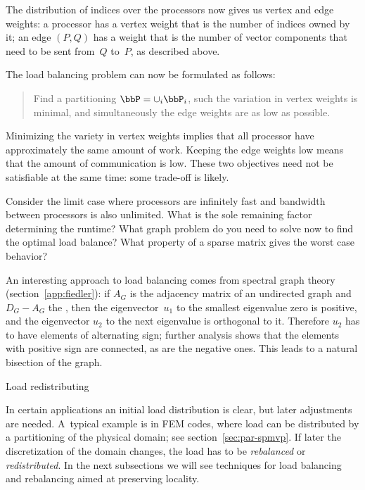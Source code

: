 The distribution of indices over the processors now gives us vertex
and edge weights: a processor has a vertex weight that is the number
of indices owned by it; an edge $(P,Q)$ has a weight that is the number of
vector components that need to be sent from~$Q$ to~$P$, as described above.

The load balancing problem can now be formulated as
follows:
\begin{quote}
  Find a partitioning $\bbP=\cup_i \bbP_i$, such the variation in
  vertex weights is minimal, and simultaneously the edge weights are
  as low as possible.
\end{quote}
Minimizing the variety in vertex weights implies that all processor
have approximately the same amount of work. Keeping the edge weights
low means that the amount of communication is low. These two
objectives need not be satisfiable at the same time: some trade-off is
likely. 

\begin{exercise}
  Consider the limit case where processors are infinitely fast and
  bandwidth between processors is also unlimited. What is the sole
  remaining factor determining the runtime? What graph problem do you
  need to solve now to find the optimal load balance? What property of
  a sparse matrix gives the worst case behavior?
\end{exercise}

An interesting approach to load balancing comes from spectral graph
theory (section~\ref{app:fiedler}): if $A_G$ is the adjacency matrix
of an undirected graph and $D_G-A_G$ the ,
then the eigenvector~$u_1$ to the smallest eigenvalue zero is
positive, and the eigenvector $u_2$ to the next eigenvalue is
orthogonal to it. Therefore $u_2$ has to have elements of alternating
sign; further analysis shows that the elements with positive sign are
connected, as are the negative ones. This leads to a natural bisection
of the graph.

 {Load redistributing}

In certain applications an initial load distribution is clear, but
later adjustments are needed. A~typical example is in \ac{FEM} codes,
where load can be distributed by a partitioning of the physical
domain; see section~\ref{sec:par-spmvp}. If later the discretization
of the domain changes, the load has to be
\emph{rebalanced} or
\emph{redistributed}. In the next
subsections we will see techniques for load balancing and
rebalancing aimed at preserving locality.

